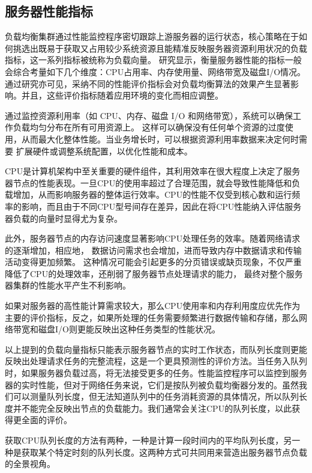 \subsection{服务器性能指标}

负载均衡集群通过性能监控程序密切跟踪上游服务器的运行状态，核心策略在于如何挑选出既易于获取又占用较少系统资源且能精准反映服务器资源利用状况的负载指标，这一系列指标被统称为负载向量。
研究显示，衡量服务器性能的指标一般会综合考量如下几个维度：CPU占用率、内存使用量、网络带宽及磁盘I/O情况。通过研究亦可见，采纳不同的性能评价指标会对负载均衡算法的效果产生显著影响。并且，这些评价指标随着应用环境的变化而相应调整。

通过监控资源利用率（如 CPU、内存、磁盘 I/O 和网络带宽），系统可以确保工作负载均匀分布在所有可用资源上。
这样可以确保没有任何单个资源的过度使用，从而最大化整体性能。当业务增长时，可以根据资源利用率数据来决定何时需要
扩展硬件或调整系统配置，以优化性能和成本。

CPU是计算机架构中至关重要的硬件组件，其利用效率在很大程度上决定了服务器节点的性能表现。一旦CPU的使用率超过了合理范围，就会导致性能降低和负载增加，从而影响服务器的整体运行效率。CPU的性能不仅受到核心数和运行频率的影响，而且由于不同CPU型号间存在差异，因此在将CPU性能纳入评估服务器负载的向量时显得尤为复杂。

此外，服务器节点的内存访问速度显著影响CPU处理任务的效率。随着网络请求的逐渐增加，相应地，
数据访问需求也会增加，进而导致内存中数据请求和传输活动变得更加频繁。
这种情况可能会引起更多的分页错误或缺页现象，不仅严重降低了CPU的处理效率，还削弱了服务器节点处理请求的能力，
最终对整个服务器集群的性能水平产生不利影响。

如果对服务器的高性能计算需求较大，那么CPU使用率和内存利用度应优先作为主要的评价指标，反之，如果所处理的任务需要频繁进行数据传输和存储，那么网络带宽和磁盘I/O则更能反映出这种任务类型的性能状况。

以上提到的负载向量指标只能表示服务器节点的实时工作状态\cite{mahato2017scheduling}，而队列长度则更能反映出处理请求任务的完整流程，这是一个更具预测性的评价方法。当任务入队列时，如果服务器负载过高，将无法接受更多的任务。性能监控程序可以监控到服务器的实时性能，但对于网络任务来说，它们是按队列被负载均衡器分发的。虽然我们可以测量队列长度，但无法知道队列中的任务消耗资源的具体情况，所以队列长度并不能完全反映出节点的负载能力。我们通常会关注CPU的队列长度，以此获得更全面的评价。

获取CPU队列长度的方法有两种，一种是计算一段时间内的平均队列长度，另一种是获取某个特定时刻的队列长度。这两种方式可共同用来营造出服务器节点负载的全景视角。

